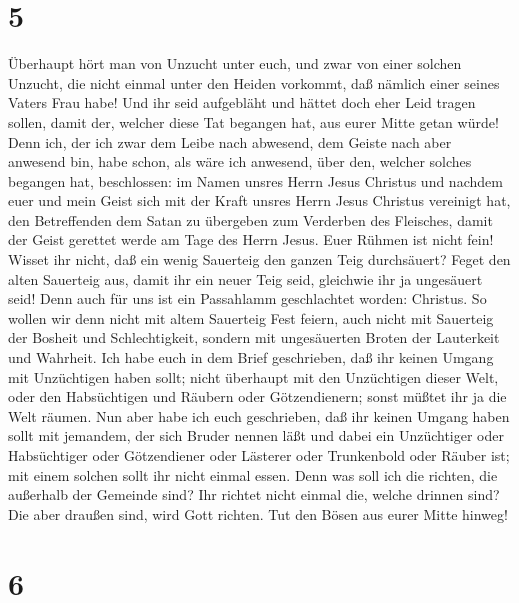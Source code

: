 \hypertarget{section-4}{%
\section{5}\label{section-4}}

 Überhaupt hört man von Unzucht unter euch, und zwar von
einer solchen Unzucht, die nicht einmal unter den Heiden vorkommt, daß
nämlich einer seines Vaters Frau habe!  Und ihr seid
aufgebläht und hättet doch eher Leid tragen sollen, damit der, welcher
diese Tat begangen hat, aus eurer Mitte getan würde!  Denn
ich, der ich zwar dem Leibe nach abwesend, dem Geiste nach aber anwesend
bin, habe schon, als wäre ich anwesend, über den, welcher solches
begangen hat, beschlossen:  im Namen unsres Herrn Jesus
Christus und nachdem euer und mein Geist sich mit der Kraft unsres Herrn
Jesus Christus vereinigt hat,  den Betreffenden dem Satan
zu übergeben zum Verderben des Fleisches, damit der Geist gerettet werde
am Tage des Herrn Jesus.  Euer Rühmen ist nicht fein!
Wisset ihr nicht, daß ein wenig Sauerteig den ganzen Teig durchsäuert?
 Feget den alten Sauerteig aus, damit ihr ein neuer Teig
seid, gleichwie ihr ja ungesäuert seid! Denn auch für uns ist ein
Passahlamm geschlachtet worden: Christus.  So wollen wir
denn nicht mit altem Sauerteig Fest feiern, auch nicht mit Sauerteig der
Bosheit und Schlechtigkeit, sondern mit ungesäuerten Broten der
Lauterkeit und Wahrheit.  Ich habe euch in dem Brief
geschrieben, daß ihr keinen Umgang mit Unzüchtigen haben sollt;
 nicht überhaupt mit den Unzüchtigen dieser Welt, oder
den Habsüchtigen und Räubern oder Götzendienern; sonst müßtet ihr ja die
Welt räumen.  Nun aber habe ich euch geschrieben, daß ihr
keinen Umgang haben sollt mit jemandem, der sich Bruder nennen läßt und
dabei ein Unzüchtiger oder Habsüchtiger oder Götzendiener oder Lästerer
oder Trunkenbold oder Räuber ist; mit einem solchen sollt ihr nicht
einmal essen.  Denn was soll ich die richten, die
außerhalb der Gemeinde sind? Ihr richtet nicht einmal die, welche
drinnen sind?  Die aber draußen sind, wird Gott richten.
Tut den Bösen aus eurer Mitte hinweg!

\hypertarget{section-5}{%
\section{6}\label{section-5}}

